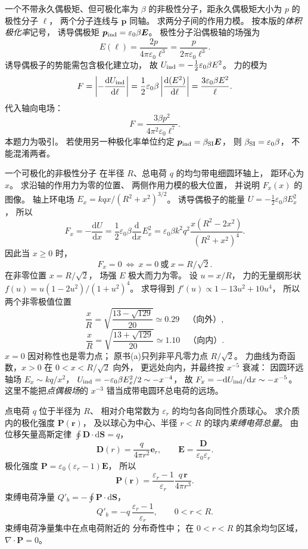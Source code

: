 一个不带永久偶极矩、但可极化率为 $\beta$
的非极性分子，距永久偶极矩大小为 $p$
的极性分子 $\ell$，
两个分子连线与 $\bm p$ 同轴。
求两分子间的作用力模。
\exsolution
按本版的\emph{体积极化率}记号，
诱导偶极矩
$\bm p_{\rm ind}=\varepsilon_0\beta\bm E$。
极性分子沿偶极轴的场强为
\[
E(\ell)=\frac{2p}{4\pi\varepsilon_0\ell^3}
=\frac{p}{2\pi\varepsilon_0\ell^3}.
\]
诱导偶极子的势能需包含极化建立功，
故
$U_{\rm ind}=-\frac12\varepsilon_0\beta E^2$。
力的模为
\[
F=\left|-\frac{\mathrm dU_{\rm ind}}{\mathrm d\ell}\right|
=\frac12\varepsilon_0\beta
\left|\frac{\mathrm d(E^2)}{\mathrm d\ell}\right|
=\frac{3\varepsilon_0\beta E^2}{\ell}.
\]
代入轴向电场：
\[
\boxed{F=\frac{3\beta p^2}
{4\pi^2\varepsilon_0\ell^7}}.
\]
\excheck 本题力为吸引。
若使用另一种极化率单位约定
$\bm p_{\rm ind}=\beta_{\rm SI}\bm E$，
则 $\beta_{\rm SI}=\varepsilon_0\beta$，
不能混淆两者。

一个可极化的非极性分子
在半径 $R$、总电荷 $q$ 的均匀带电细圆环轴上，
距环心为 $x$。
求沿轴的作用力为零的位置、
两侧作用力模的极大位置，
并说明 $F_x(x)$ 的图像。
\exsolution
轴上环电场
$E_x=kqx/(R^2+x^2)^{3/2}$。
诱导偶极子的能量
$U=-\frac12\varepsilon_0\beta E_x^2$，
所以
\[
F_x=-\frac{\mathrm dU}{\mathrm dx}
=\frac12\varepsilon_0\beta
\frac{\mathrm d}{\mathrm dx}E_x^2
=\varepsilon_0\beta k^2q^2
\frac{x(R^2-2x^2)}{(R^2+x^2)^4}.
\]
因此当 $x\ge0$ 时，
\[
\boxed{F_x=0\ \Longleftrightarrow\
x=0\ \text{或}\ x=R/\sqrt2}.
\]
在非零位置 $x=R/\sqrt2$，
场强 $E$ 极大而力为零。
设 $u=x/R$，
力的无量纲形状
$f(u)=u(1-2u^2)/(1+u^2)^4$。
求导得到
$f'(u)\propto1-13u^2+10u^4$，
所以两个非零极值位置
\[
\boxed{\frac{x}{R}=
\sqrt{\frac{13-\sqrt{129}}{20}}
\simeq0.29\quad\text{（向外）}},
\]
\[
\boxed{\frac{x}{R}=
\sqrt{\frac{13+\sqrt{129}}{20}}
\simeq1.10\quad\text{（向内）}}.
\]
\excheck $x=0$ 因对称性也是零力点；
原书(a)只列非平凡零力点 $R/\sqrt2$。
力曲线为奇函数，$x>0$ 在
$0<x<R/\sqrt2$ 向外，
更远处向内，并最终按 $x^{-5}$ 衰减：
因圆环远轴场 $E_x\sim kq/x^2$，
$U_{\rm ind}=-\varepsilon_0\beta E_x^2/2\sim-x^{-4}$，
故
$F_x=-\mathrm dU_{\rm ind}/\mathrm dx\sim-x^{-5}$。
这里不能把\emph{点偶极场}的 $x^{-3}$
错当成带电圆环总电荷的远场。

点电荷 $q$ 位于半径为 $R$、
相对介电常数为 $\varepsilon_r$
的均匀各向同性介质球心。
求介质内的极化强度 $\bm P(\bm r)$，
及以球心为中心、半径 $r<R$
的球内\emph{束缚电荷总量}。
\exsolution
由位移矢量高斯定律
$\oint\bm D\cdot\mathrm d\bm S=q$，
\[
\bm D(r)=\frac{q}{4\pi r^2}\bm e_r,\qquad
\bm E=\frac{\bm D}{\varepsilon_0\varepsilon_r}.
\]
极化强度
$\bm P=\varepsilon_0(\varepsilon_r-1)\bm E$，
所以
\[
\boxed{\bm P(\bm r)=
\frac{\varepsilon_r-1}{\varepsilon_r}
\frac{q\,\bm r}{4\pi r^3}}.
\]
束缚电荷净量
$Q'_b=-\oint\bm P\cdot\mathrm d\bm S$，
\[
\boxed{Q'_b=
-q\,\frac{\varepsilon_r-1}{\varepsilon_r}},
\qquad 0<r<R.
\]
\excheck 束缚电荷净量集中在点电荷附近的
分布奇性中；
在 $0<r<R$ 的其余均匀区域，
$\nabla\cdot\bm P=0$。

